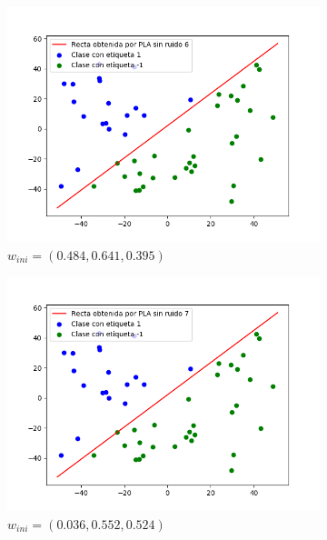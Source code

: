 \documentclass[12pt,a4paper]{article}
\begin{document}
\begin{figure}[H]
	\centering
	\begin{subfigure}{0.32\textwidth}
		\includegraphics[scale=0.37]{./Imagenes/ej2-8.png}
		\caption{$w_{ini} = (0.484,0.641,0.395)$}
	\end{subfigure}
	\begin{subfigure}{0.33\textwidth}
		\includegraphics[scale=0.37]{./Imagenes/ej2-9.png}
		\caption{$w_{ini} = (0.036,0.552,0.524)$}
	\end{subfigure}
	\begin{subfigure}{0.33\textwidth}

\end{subfigure}
\end{figure}
\end{document}
